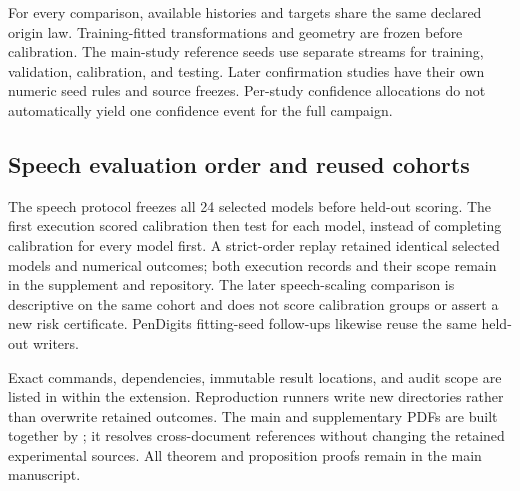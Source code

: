 For every comparison, available histories and targets share the same declared
origin law. Training-fitted transformations and geometry are frozen before
calibration. The main-study reference seeds use separate streams for training,
validation, calibration, and testing. Later confirmation studies have their
own numeric seed rules and source freezes. Per-study confidence allocations
do not automatically yield one confidence event for the full campaign.

\subsection{Speech evaluation order and reused cohorts}
\label{app:speech-protocol}

The speech protocol freezes all 24 selected models before held-out scoring.
The first execution scored calibration then test for each model, instead of
completing calibration for every model first. A strict-order replay retained
identical selected models and numerical outcomes; both execution records and
their scope remain in the supplement and repository. The later speech-scaling
comparison is descriptive on the same cohort and does not score calibration
groups or assert a new risk certificate. PenDigits fitting-seed follow-ups
likewise reuse the same held-out writers.

Exact commands, dependencies, immutable result locations, and audit scope are
listed in  within the extension. Reproduction
runners write new directories rather than overwrite retained outcomes. The
main and supplementary PDFs are built together by
; it resolves cross-document references
without changing the retained experimental sources. All theorem and proposition
proofs remain in the main manuscript.
